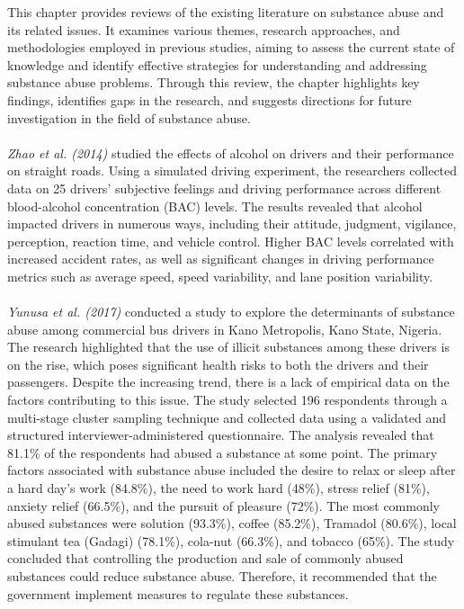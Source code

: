 \documentclass[12pt]{report}
\begin{document}
This chapter provides reviews of the existing literature on substance abuse and its related issues. It examines various themes, research approaches, and methodologies employed in previous studies, aiming to assess the current state of knowledge and identify effective strategies for understanding and addressing substance abuse problems. Through this review, the chapter highlights key findings, identifies gaps in the research, and suggests directions for future investigation in the field of substance abuse.\\\\
\textit{Zhao et al. (2014)} studied the effects of alcohol on drivers and their performance on straight roads. Using a simulated driving experiment, the researchers collected data on 25 drivers’ subjective feelings and driving performance across different blood-alcohol concentration (BAC) levels. The results revealed that alcohol impacted drivers in numerous ways, including their attitude, judgment, vigilance, perception, reaction time, and vehicle control. Higher BAC levels correlated with increased accident rates, as well as significant changes in driving performance metrics such as average speed, speed variability, and lane position variability.\\\\
\textit{Yunusa et al. (2017)} conducted a study to explore the determinants of substance abuse among commercial bus drivers in Kano Metropolis, Kano State, Nigeria. The research highlighted that the use of illicit substances among these drivers is on the rise, which poses significant health risks to both the drivers and their passengers. Despite the increasing trend, there is a lack of empirical data on the factors contributing to this issue. The study selected 196 respondents through a multi-stage cluster sampling technique and collected data using a validated and structured interviewer-administered questionnaire. The analysis revealed that 81.1\% of the respondents had abused a substance at some point. The primary factors associated with substance abuse included the desire to relax or sleep after a hard day's work (84.8\%), the need to work hard (48\%), stress relief (81\%), anxiety relief (66.5\%), and the pursuit of pleasure (72\%). The most commonly abused substances were solution (93.3\%), coffee (85.2\%), Tramadol (80.6\%), local stimulant tea (Gadagi) (78.1\%), cola-nut (66.3\%), and tobacco (65\%). The study concluded that controlling the production and sale of commonly abused substances could reduce substance abuse. Therefore, it recommended that the government implement measures to regulate these substances. \\\\ 
\end{document}
